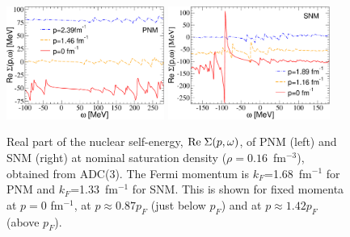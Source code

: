 \begin{figure}[tb]
\begin{center}
\includegraphics[width=0.46\textwidth]{Chapter11-figures/real_self_energy_pnm.pdf}  \hspace{0.05\textwidth}
\includegraphics[width=0.472\textwidth]{Chapter11-figures/real_self_energy_snm.pdf}
\caption{Real part of the nuclear self-energy, ${\rm Re} \; \Sigma(p,\omega)$, of PNM (left) and SNM (right) at nominal saturation density ($\rho=0.16$~fm$^{-3}$), obtained from ADC(3).  The Fermi momentum is $k_F$=1.68~fm$^{-1}$ for PNM and $k_F$=1.33~fm$^{-1}$ for SNM.  This is shown for fixed momenta at  $p=0$ fm$^{-1}$, at  $p\approx0.87p_F$ (just below $p_F$) and at $p\approx1.42p_F$ (above $p_F$).}
\label{fig:minn_ReSE}
\end{center}
\end{figure}


